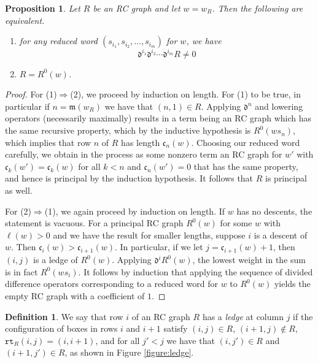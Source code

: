 \documentclass{amsart}
\newtheorem{proposition}[lemma]{Proposition}
\theoremstyle{definition}
\newtheorem{definition}[lemma]{Definition}
\theoremstyle{remark}
\numberwithin{equation}{subsection}
\newcommand{\wof}[1]{w_{#1}}
\newcommand{\rcdd}{\mathfrak{d}}
\newcommand{\rtt}{\mathtt{rt}}
\newcommand{\code}{\mathfrak{c}}
\newcommand{\maxd}{\mathfrak{m}}
\begin{document}
\begin{proposition} \label{proposition:divdiffprincipal}
Let $R$ be an RC graph and let $w=\wof{R}$. Then the following are equivalent.
\begin{enumerate}
\item for any reduced word $(s_{i_1}, s_{i_2}, \ldots, s_{i_m})$ for $w$, we have
$$\rcdd^{i_1}\rcdd^{i_2}\cdots \rcdd^{i_m}R \neq 0$$

\item $R = R^0(w)$.
\end{enumerate}
\end{proposition}
\begin{proof}
For (1)$\Rightarrow$(2), we proceed by induction on length. For (1) to be true, in particular if $n=\maxd(\wof{R})$ we have that $(n,1)\in R$. Applying $\rcdd^n$ and lowering operators (necessarily maximally) results in a term being an RC graph which has the same recursive property, which by the inductive hypothesis is $R^0(ws_n)$, which implies that row $n$ of $R$ has length $\code_n(w)$. Choosing our reduced word carefully, we obtain in the process as some nonzero term an RC graph for $w'$ with $\code_k(w') = \code_k(w)$ for all $k<n$ and $\code_n(w')=0$ that has the same property, and hence is principal by the induction hypothesis. It follows that $R$ is principal as well.

For (2)$\Rightarrow$(1), we again proceed by induction on length. If $w$ has no descents, the statement is vacuous. For a principal RC graph $R^0(w)$ for some $w$ with $\ell(w)>0$ and we have the result for smaller lengths, suppose $i$ is a descent of $w$. Then $\code_i(w) > \code_{i+1}(w)$. In particular, if we let $j = \code_{i+1}(w) + 1$, then $(i,j)$ is a ledge of $R^0(w)$. Applying $\rcdd^iR^0(w)$, the lowest weight in the sum is in fact $R^0(ws_i)$. It follows by induction that applying the sequence of divided difference operators corresponding to a reduced word for $w$ to $R^0(w)$ yields the empty RC graph with a coefficient of $1$.
\end{proof}

  \begin{definition}
We say that row $i$ of an RC graph $R$ has a \emph{ledge} at column $j$ if the configuration of boxes in rows $i$ and $i+1$ satisfy $(i,j)\in R$, $(i+1,j)\notin  R$, $\rtt_R(i,j)=(i,i+1)$, and for all $j' < j$ we have that $(i,j')\in R$ and $(i+1,j')\in R$, as shown in Figure \ref{figure:ledge}.
\end{definition}
\end{document}
